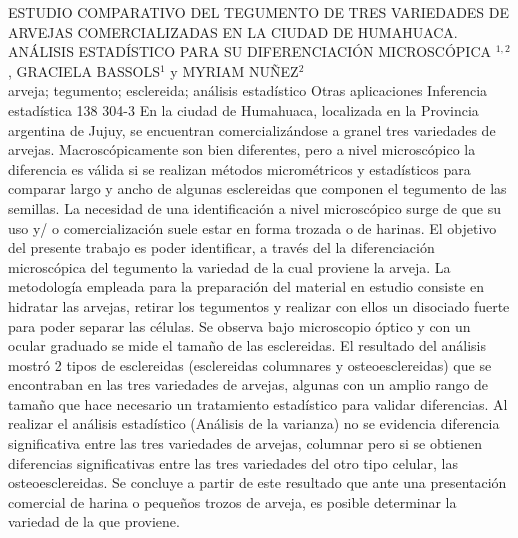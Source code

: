 \A
{ESTUDIO COMPARATIVO DEL TEGUMENTO DE TRES VARIEDADES DE ARVEJAS COMERCIALIZADAS EN LA CIUDAD DE HUMAHUACA. ANÁLISIS ESTADÍSTICO PARA SU DIFERENCIACIÓN MICROSCÓPICA}
{$^{1,2}$, GRACIELA BASSOLS$^1$ y MYRIAM NUÑEZ$^2$}
{
\\}
{arveja; tegumento; esclereida; análisis estadístico} 
 {Otras aplicaciones} 
 {Inferencia estadística} 
 {138} 
 {304-3}
{En la ciudad de Humahuaca, localizada en la Provincia argentina de Jujuy, se encuentran comercializándose a granel tres variedades de arvejas. Macroscópicamente son bien diferentes, pero a nivel microscópico la diferencia es válida si se realizan métodos micrométricos y estadísticos para comparar largo y ancho de algunas esclereidas que componen el tegumento de las semillas. La necesidad de una identificación a nivel microscópico surge de que su uso y/ o comercialización suele estar en forma trozada o de harinas. El objetivo del presente trabajo es poder identificar, a través del la diferenciación microscópica del tegumento la variedad de la cual proviene la arveja. La metodología empleada para la preparación del material en estudio consiste en hidratar las arvejas, retirar los tegumentos y realizar con ellos un disociado fuerte para poder separar las células. Se observa bajo microscopio óptico y con un ocular graduado se mide el tamaño de las esclereidas. El resultado del análisis mostró 2 tipos de esclereidas (esclereidas columnares y osteoesclereidas) que se encontraban en las tres variedades de arvejas, algunas con un amplio rango de tamaño que hace necesario un tratamiento estadístico para validar diferencias. Al realizar el análisis estadístico (Análisis de la varianza) no se evidencia diferencia significativa entre las tres variedades de arvejas, columnar pero si se obtienen diferencias significativas entre las tres variedades del otro tipo celular, las osteoesclereidas. Se concluye a partir de este resultado que ante una presentación comercial de harina o pequeños trozos de arveja, es posible determinar la variedad de la que proviene.}
